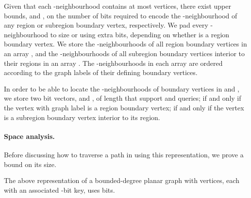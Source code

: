 Given that each -neighbourhood contains at most 
vertices, there exist upper bounds,  and , on the number of
bits required to encode the -neighbourhood of any region or
subregion boundary vertex, respectively.
We pad every -neighbourhood  to size  or
 using extra bits, depending on whether  is a region boundary
vertex.
We store the -neighbourhoods of all region boundary vertices in
an array , and the -neighbourhoods of all subregion boundary
vertices interior to their regions in an array .
The -neighbourhoods in each array are ordered according to the graph
labels of their defining boundary vertices.

In order to be able to locate the -neighbourhoods of boundary vertices
in  and , we store two bit vectors,
 and , of length  that support 
and  queries;
 if and only if the vertex with graph label  is a region
boundary vertex;  if and only if the vertex is a subregion
boundary vertex interior to its region.

\paragraph{Space analysis.}


Before discussing how to traverse a path in  using this
representation, we prove a bound on its size.

\begin{lemma}
  \label{lem:main_space}
  The above representation of a bounded-degree planar graph  with
   vertices, each with an associated -bit key, uses 
   bits.
\end{lemma}


